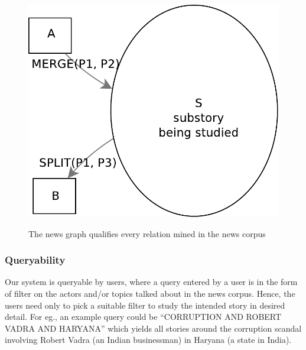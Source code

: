 \begin{figure}
\begin{center}
\caption{The news graph qualifies every relation mined in the news corpus}
\includegraphics[scale=0.34]{figures/graph-4.pdf}
\label{fig:related-articles}
\end{center}
\end{figure}

\subsubsection{Queryability}
Our system is queryable by users, where a query entered by a user is in the form of filter on the actors and/or topics talked about in the
news corpus. Hence, the users need only to pick a suitable filter to study the intended story in desired detail. For eg., an example query could
be ``CORRUPTION AND ROBERT VADRA AND HARYANA'' which yields all stories around the corruption scandal involving Robert Vadra
(an Indian businessman) in Haryana (a state in India).
